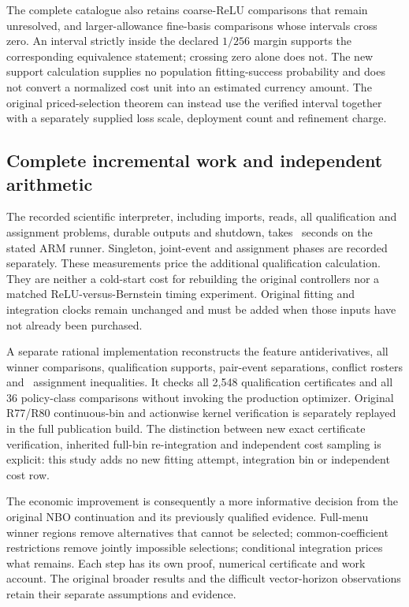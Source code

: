 The complete catalogue also retains coarse-ReLU comparisons that remain unresolved, and larger-allowance fine-basis comparisons whose intervals cross zero. An interval strictly inside the declared $1/256$ margin supports the corresponding equivalence statement; crossing zero alone does not. The new support calculation supplies no population fitting-success probability and does not convert a normalized cost unit into an estimated currency amount. The original priced-selection theorem can instead use the verified interval together with a separately supplied loss scale, deployment count and refinement charge.

\subsection{Complete incremental work and independent arithmetic}
The recorded scientific interpreter, including imports, reads, all qualification and assignment problems, durable outputs and shutdown, takes \CompleteScientificSeconds\ seconds on the stated ARM runner. Singleton, joint-event and assignment phases are recorded separately. These measurements price the additional qualification calculation. They are neither a cold-start cost for rebuilding the original controllers nor a matched ReLU-versus-Bernstein timing experiment. Original fitting and integration clocks remain unchanged and must be added when those inputs have not already been purchased.

A separate rational implementation reconstructs the feature antiderivatives, all winner comparisons, qualification supports, pair-event separations, conflict rosters and \IndependentInequalities\ assignment inequalities. It checks all 2,548 qualification certificates and all 36 policy-class comparisons without invoking the production optimizer. Original R77/R80 continuous-bin and actionwise kernel verification is separately replayed in the full publication build. The distinction between new exact certificate verification, inherited full-bin re-integration and independent cost sampling is explicit: this study adds no new fitting attempt, integration bin or independent cost row.

The economic improvement is consequently a more informative decision from the original NBO continuation and its previously qualified evidence. Full-menu winner regions remove alternatives that cannot be selected; common-coefficient restrictions remove jointly impossible selections; conditional integration prices what remains. Each step has its own proof, numerical certificate and work account. The original broader results and the difficult vector-horizon observations retain their separate assumptions and evidence.
